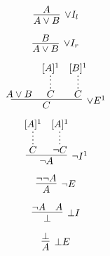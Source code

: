 \begin{multicols}{2}
    \noindent
    \begin{minipage}{\linewidth}
        $$
            \infer[\lor I_l]{A \lor B}{A}
        $$
    \end{minipage}

    \noindent
    \begin{minipage}{\linewidth}
        $$
            \infer[\lor I_r]{A \lor B}{B}
        $$
    \end{minipage}
\end{multicols}

\noindent
\begin{minipage}{\linewidth}
    $$
        \infer[\lor E^1]{C}{
            A \lor B \quad
            \infer*{C}{[A]^1} \quad
            \infer*{C}{[B]^1}
        }
    $$
\end{minipage}

\begin{multicols}{2}
    \noindent
    \begin{minipage}{\linewidth}
        $$
            \infer[\neg I^1]{\neg A}{
                \infer*{C}{[A]^1} \quad \infer*{\neg C}{[A]^1}
            }
        $$
    \end{minipage}

    \noindent
    \begin{minipage}{\linewidth}
        \vspace*{1cm}
        $$
            \infer[\neg E]{A}{\neg \neg A}
        $$
    \end{minipage}
\end{multicols}

\begin{multicols}{2}
    \noindent
    \begin{minipage}{\linewidth}
        $$
            \infer[\bot I]{\bot}{\neg A \quad A}
        $$
    \end{minipage}

    \noindent
    \begin{minipage}{\linewidth}
        $$
            \infer[\bot E]{A}{\bot}
        $$
    \end{minipage}
\end{multicols}